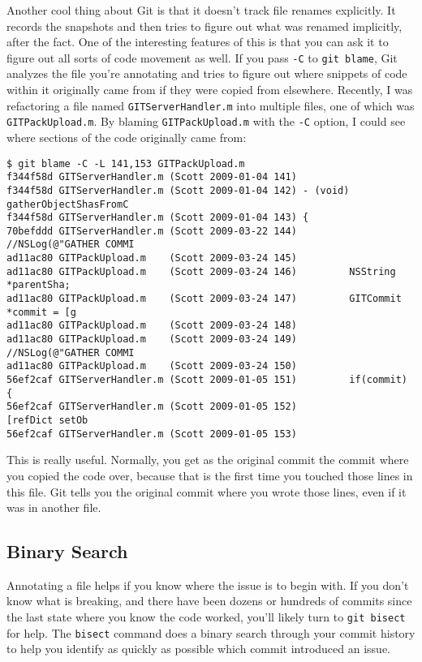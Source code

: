\documentclass[a4paper]{book}
\begin{document}
Another cool thing about Git is that it doesn't track file renames explicitly. It records the snapshots and then tries to figure out what was renamed implicitly, after the fact. One of the interesting features of this is that you can ask it to figure out all sorts of code movement as well. If you pass \texttt{-C} to \texttt{git blame}, Git analyzes the file you're annotating and tries to figure out where snippets of code within it originally came from if they were copied from elsewhere. Recently, I was refactoring a file named \texttt{GITServerHandler.m} into multiple files, one of which was \texttt{GITPackUpload.m}. By blaming \texttt{GITPackUpload.m} with the \texttt{-C} option, I could see where sections of the code originally came from:

\begin{shaded}\begin{verbatim}
$ git blame -C -L 141,153 GITPackUpload.m
f344f58d GITServerHandler.m (Scott 2009-01-04 141)
f344f58d GITServerHandler.m (Scott 2009-01-04 142) - (void) gatherObjectShasFromC
f344f58d GITServerHandler.m (Scott 2009-01-04 143) {
70befddd GITServerHandler.m (Scott 2009-03-22 144)         //NSLog(@"GATHER COMMI
ad11ac80 GITPackUpload.m    (Scott 2009-03-24 145)
ad11ac80 GITPackUpload.m    (Scott 2009-03-24 146)         NSString *parentSha;
ad11ac80 GITPackUpload.m    (Scott 2009-03-24 147)         GITCommit *commit = [g
ad11ac80 GITPackUpload.m    (Scott 2009-03-24 148)
ad11ac80 GITPackUpload.m    (Scott 2009-03-24 149)         //NSLog(@"GATHER COMMI
ad11ac80 GITPackUpload.m    (Scott 2009-03-24 150)
56ef2caf GITServerHandler.m (Scott 2009-01-05 151)         if(commit) {
56ef2caf GITServerHandler.m (Scott 2009-01-05 152)                 [refDict setOb
56ef2caf GITServerHandler.m (Scott 2009-01-05 153)
\end{verbatim}\end{shaded}

This is really useful. Normally, you get as the original commit the commit where you copied the code over, because that is the first time you touched those lines in this file. Git tells you the original commit where you wrote those lines, even if it was in another file.

\subsection{Binary Search}

Annotating a file helps if you know where the issue is to begin with. If you don't know what is breaking, and there have been dozens or hundreds of commits since the last state where you know the code worked, you'll likely turn to \texttt{git bisect} for help. The \texttt{bisect} command does a binary search through your commit history to help you identify as quickly as possible which commit introduced an issue.
\end{document}
